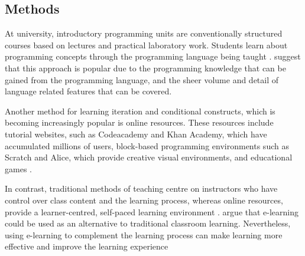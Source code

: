 \documentclass[a4paper,11.5pt]{report}
\numberwithin{figure}{section}
\numberwithin{table}{section}
\numberwithin{equation}{section}
\numberwithin{equation}{section}
\begin{document}


\subsection{Methods}

At university, introductory programming units are conventionally structured courses based on lectures and practical laboratory work. Students learn about programming concepts through the programming language being taught \citep{Robins2003, acm}. \citeauthor{Robins2003} suggest that this approach is popular due to the programming knowledge that can be gained from the programming language, and the sheer volume and detail of language related features that can be covered.

Another method for learning iteration and conditional constructs, which is becoming increasingly popular is online resources. These resources include tutorial websites, such as Codeacademy and Khan Academy, which have accumulated millions of users, block-based programming environments such as Scratch and Alice, which provide creative visual environments, and educational games \citep{Lee2015}. 

In contrast, traditional methods of teaching centre on instructors who have control over class content and the learning process, whereas online resources, provide a learner-centred, self-paced learning environment \citep{Zhang2004}. \citet{Zhang2004} argue that e-learning could be used as an alternative to traditional classroom learning. Nevertheless, using e-learning to complement the learning process can make learning more effective and improve the learning experience \citep{Zhang2004, Concannon2005}

\end{document}
